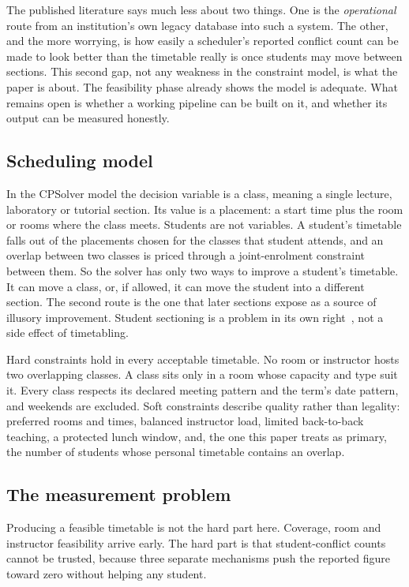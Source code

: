 \documentclass[journal]{IEEEtran}
\begin{document}
The published literature says much less about two things. One is the \emph{operational} route from an institution's own legacy database into such a system. The other, and the more worrying, is how easily a scheduler's reported conflict count can be made to look better than the timetable really is once students may move between sections. This second gap, not any weakness in the constraint model, is what the paper is about. The feasibility phase already shows the model is adequate. What remains open is whether a working pipeline can be built on it, and whether its output can be measured honestly.

\subsection{Scheduling model}
In the CPSolver model the decision variable is a class, meaning a single lecture, laboratory or tutorial section. Its value is a placement: a start time plus the room or rooms where the class meets. Students are not variables. A student's timetable falls out of the placements chosen for the classes that student attends, and an overlap between two classes is priced through a joint-enrolment constraint between them. So the solver has only two ways to improve a student's timetable. It can move a class, or, if allowed, it can move the student into a different section. The second route is the one that later sections expose as a source of illusory improvement. Student sectioning is a problem in its own right~\cite{muller2010sectioning}, not a side effect of timetabling.

Hard constraints hold in every acceptable timetable. No room or instructor hosts two overlapping classes. A class sits only in a room whose capacity and type suit it. Every class respects its declared meeting pattern and the term's date pattern, and weekends are excluded. Soft constraints describe quality rather than legality: preferred rooms and times, balanced instructor load, limited back-to-back teaching, a protected lunch window, and, the one this paper treats as primary, the number of students whose personal timetable contains an overlap.

\subsection{The measurement problem}
\label{sec:measurement-problem}
Producing a feasible timetable is not the hard part here. Coverage, room and instructor feasibility arrive early. The hard part is that student-conflict counts cannot be trusted, because three separate mechanisms push the reported figure toward zero without helping any student.
\end{document}
